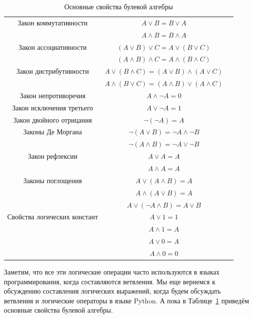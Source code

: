\begin{table}[!ht]
\centering
\begin{tabular}{|c|c|c|}
\hline
Закон коммутативности     & $A \vee B = B \vee A$ \\
                          & $A \wedge B = B \wedge A$ \\\hline
Закон ассоциативности     & $(A \vee B) \vee C = A \vee (B \vee C)$ \\
                          & $(A \wedge B) \wedge C = A \wedge (B \wedge C)$ \\\hline
Закон дистрибутивности    & $A \vee (B \wedge C) = (A \vee B) \wedge (A \vee C)$ \\
                          & $A \wedge (B \vee C) = (A \wedge B) \vee (A \wedge C)$ \\\hline
Закон непротиворечия      & $A \wedge \lnot A = 0$ \\\hline
Закон исключения третьего & $A \vee \lnot A = 1$ \\\hline
Закон двойного отрицания  & $\lnot(\lnot A) = A$ \\\hline
Законы Де Моргана         & $\lnot (A \vee B) = \lnot A \wedge \lnot B$ \\
                          & $\lnot (A \wedge B) = \lnot A \vee \lnot B$ \\\hline
Закон рефлексии           & $A \vee A = A$ \\
                          & $A \wedge A = A$ \\\hline
Законы поглощения         & $A \vee (A \wedge B) = A$ \\
                          & $A \wedge (A \vee B) = A$ \\
                          & $A \vee (\lnot A \wedge B) = A \vee B$ \\\hline
Свойства логических констант & $A \vee 1 = 1$ \\
                             & $A \wedge 1 = A$ \\
                             & $A \vee 0 = A$ \\
                             & $A \wedge 0 = 0$ \\\hline
\end{tabular}
\caption{Основные свойства булевой алгебры}
\label{tab:logic:properties}
\end{table}

Заметим, что все эти логические операции часто используются в языках 
программирования, когда составляются ветвления. Мы еще вернемся 
к обсуждению составления логических выражений, когда будем обсуждать
ветвления и логические операторы в языке Python. А пока в 
Таблице~\ref{tab:logic:properties} приведём основные свойства булевой
алгебры.


